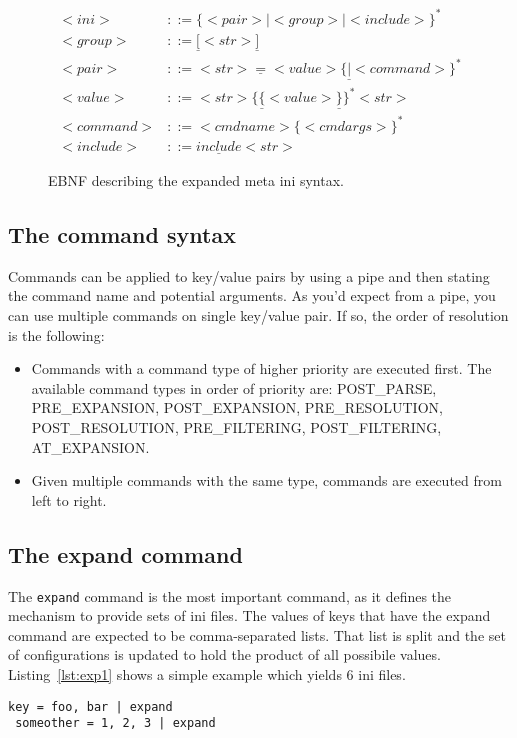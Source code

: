 \documentclass[11pt]{article}
\begin{document}
\begin{figure}
\begin{align*}
 <ini> & ::= \{<pair> | <group> | <include> \}^* \\
 <group> & ::= \underline{[}<str>\underline{]} \\
 <pair> & ::= <str>\underline{ = }<value>\{\underline{|} <command>\}^* \\
 <value> & ::= <str>\{\underline{\{}<value>\underline{\}}\}^*<str> \\
 <command> & ::= <cmdname> \{<cmdargs>\}^* \\
 <include> & ::= \underline{include} <str>
\end{align*}
\caption{EBNF describing the expanded meta ini syntax.}
\label{fig:metaebnf}
\end{figure}

\subsection{The command syntax}

Commands can be applied to key/value pairs by using a pipe and then stating the command name and potential arguments. As you'd expect from a pipe, you can use multiple commands on single key/value pair. If so, the order of resolution is the following:
\begin{itemize}
 \item Commands with a command type of higher priority are executed first. The available command types in order of priority are: POST\_PARSE, PRE\_EXPANSION, POST\_EXPANSION, PRE\_RESOLUTION, POST\_RESOLUTION, PRE\_FILTERING, POST\_FILTERING, AT\_EXPANSION.
 \item Given multiple commands with the same type, commands are executed from left to right.
\end{itemize}

\subsection{The expand command}

The \lstinline!expand! command is the most important command, as it defines the mechanism to provide sets of ini files. The values of keys that have the expand command are expected to be comma-separated lists. That list is split and the set of configurations is updated to hold the product of all possibile values. Listing~\ref{lst:exp1} shows a simple example which yields 6 ini files.

\begin{lstlisting}[caption={A simple example of expanded keys},label=lst:exp1]
 key = foo, bar | expand
 someother = 1, 2, 3 | expand
\end{lstlisting}
\end{document}
